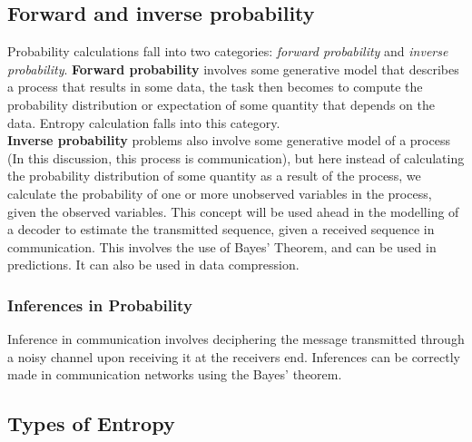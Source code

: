 \documentclass[10pt,twocolumn,letterpaper]{article}
\begin{document}
\subsection{Forward and inverse probability}
Probability calculations fall into two categories: \textit{forward probability} and \textit{inverse probability}.
\textbf{Forward probability} involves some generative model that describes a process that results in some data, the task then becomes to compute the probability distribution or expectation of some quantity that depends on the data. Entropy calculation falls into this category.\\
\textbf{Inverse probability} problems also involve some generative model of a process (In this discussion, this process is communication), but here instead of calculating the probability distribution of some quantity as a result of the process, we calculate the probability of one or more unobserved variables in the process, given the observed variables. This concept will be used ahead in the modelling of a decoder to estimate the transmitted sequence, given a received sequence in communication. This involves the use of Bayes' Theorem, and can be used in predictions. It can also be used in data compression.
\subsubsection{Inferences in Probability}
Inference in communication involves deciphering the message transmitted through a noisy channel upon receiving it at the receivers end. Inferences can be correctly made in communication networks using the Bayes' theorem.

\subsection{Types of Entropy}
\end{document}
